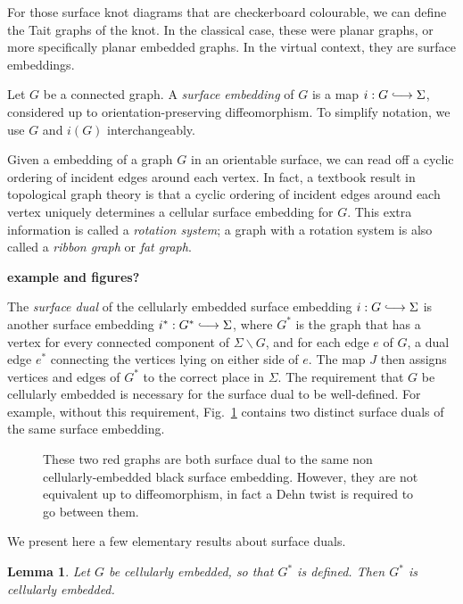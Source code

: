 \documentclass[12pt]{report}
\newcommand{\inject}{\lhook\joinrel\longrightarrow}
\newcommand{\notered}[1]{{\color{Red} \textbf{#1}}}
\newtheorem*{lemma}{Lemma}
\theoremstyle{upright}
\begin{document}
For those surface knot diagrams that are checkerboard colourable, we can define the Tait graphs of the knot. In the classical case, these were planar graphs, or more specifically planar embedded graphs. In the virtual context, they are surface embeddings.

Let $G$ be a connected graph. A \textit{surface embedding} of $G$ is a map $i: G \inject \Sigma$, considered up to orientation-preserving diffeomorphism. To simplify notation, we use $G$ and $i(G)$ interchangeably.

Given a embedding of a graph $G$ in an orientable surface, we can read off a cyclic ordering of incident edges around each vertex. In fact, a textbook result in topological graph theory is that a cyclic ordering of incident edges around each vertex uniquely determines a cellular surface embedding for $G$\cite[Theorem 3.2.4]{graphs-on-surfaces}. This extra information is called a \textit{rotation system}; a graph with a rotation system is also called a \textit{ribbon graph} or \textit{fat graph}.

\notered{example and figures?}

The \textit{surface dual} of the cellularly embedded surface embedding $i: G \inject \Sigma$ is another surface embedding $i^{*}: G^{*} \inject \Sigma$, where $G^{*}$ is the graph that has a vertex for every connected component of  $\Sigma \smallsetminus G$, and for each edge $e$ of $G$, a dual edge $e^{\ast}$ connecting the vertices lying on either side of $e$. The map $J$ then assigns vertices and edges of $G^{*}$ to the correct place in $\Sigma$. The requirement that $G$ be cellularly embedded is necessary for the surface dual to be well-defined. For example, without this requirement, Fig.~\ref{fig:multiple_dual_graphs} contains two distinct surface duals of the same surface embedding.

\begin{figure}[hbt!]
	\centering
	\def\svgscale{0.45}
	
	
	\caption{These two red graphs are both surface dual to the same non cellularly-embedded black surface embedding. However, they are not equivalent up to diffeomorphism, in fact a Dehn twist is required to go between them.}
	\label{fig:multiple_dual_graphs}
\end{figure}


We present here a few elementary results about surface duals.

\begin{lemma}
Let $G$ be cellularly embedded, so that $G^{*}$ is defined. Then $G^{*}$ is cellularly embedded.
\end{lemma}
\end{document}
